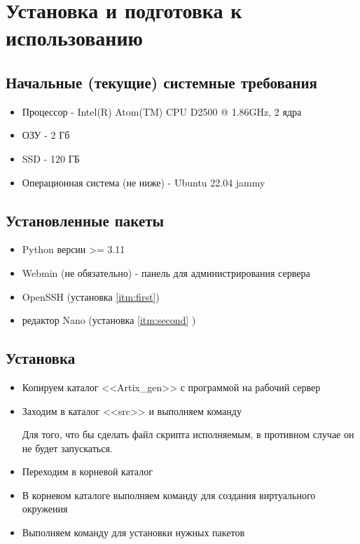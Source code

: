 \section{Установка и подготовка к использованию}
\subsection{Начальные (текущие) системные требования}

\begin{itemize}[label=$\ast$]
	\item	Процессор - Intel(R) Atom(TM) CPU D2500 @ 1.86GHz, 2 ядра
	\item	ОЗУ - 2 Гб 
	\item	SSD - 120 ГБ
	\item	Операционная система (не ниже)  - Ubuntu 22.04 jammy
\end{itemize}	


\subsection{Установленные пакеты}

\begin{itemize}[label=$\ast$]
	\item	Python версии >= 3.11
	\item	Webmin (не обязательно) - панель для администрирования сервера 
	\item	OpenSSH (установка \ref{itm:first})
	\item	редактор Nano (установка \ref{itm:second} )
\end{itemize}	




\subsection{Установка}

\begin{itemize}
	\item Копируем каталог <<Artix\_gen>> с программой на рабочий сервер
	\item  Заходим в каталог <<src>> и выполняем команду
	
	
	Для того, что бы сделать файл скрипта исполняемым, в противном случае он не будет запускаться.  

	\item Переходим в корневой каталог
	
 
	\item В корневом каталоге выполняем команду для создания виртуального окружения
	

   
	\item  Выполняем команду для установки нужных пакетов
	
	
\end{itemize}
